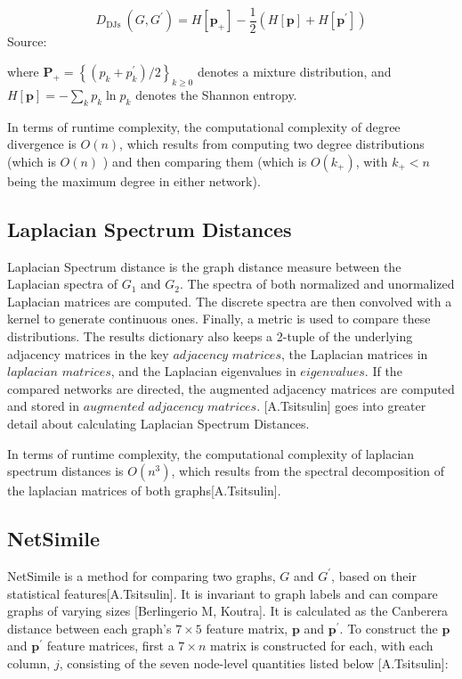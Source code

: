 \begin{equation}
D_{\text {DJs }}\left(G, G^{\prime}\right)=H\left[\mathbf{p}_{+}\right]-\frac{1}{2}\left(H[\mathbf{p}]+H\left[\mathbf{p}^{\prime}\right]\right)
\end{equation}
Source: \cite{Tsitsulin:2018:1}

where $\mathbf{P}_{+}=\left\{\left(p_{k}+p_{k}^{\prime}\right) / 2\right\}_{k \geq 0}$ denotes a mixture distribution, and $H[\mathbf{p}]=-\sum_{k} p_{k} \ln p_{k}$ denotes the Shannon entropy. 

In terms of runtime complexity, the computational complexity of degree divergence is $O(n)$, which results from computing two degree distributions (which is $O(n)$ ) and then comparing them (which is $O\left(k_{+}\right)$, with $k_{+}<n$ being the maximum degree in either network)\cite{Tsitsulin:2018:1}.

\subsection{Laplacian Spectrum Distances}
Laplacian Spectrum distance is the graph distance measure between the Laplacian spectra of $G_1$ and ${G_2}$. The spectra of both normalized and unormalized Laplacian matrices are computed. The discrete spectra are then convolved with a kernel to generate continuous ones. Finally, a metric is used to compare these distributions. The results dictionary also keeps a 2-tuple of the underlying adjacency matrices in the key $adjacency$ $matrices$, the Laplacian matrices in $laplacian$ $matrices$, and the Laplacian eigenvalues in $eigenvalues$. If the compared networks are directed, the augmented adjacency matrices are computed and stored in $augmented$ $adjacency$ $matrices$. [A.Tsitsulin] goes into greater detail about calculating Laplacian Spectrum Distances.

In terms of runtime complexity, the computational complexity of laplacian spectrum distances is $O(n^{3})$, which results from the spectral decomposition of the laplacian matrices of both graphs[A.Tsitsulin].

\subsection{NetSimile}
NetSimile is a method for comparing two graphs, $G$ and $G^{\prime}$, based on their statistical features[A.Tsitsulin]. It is invariant to graph labels and can compare graphs of varying sizes [Berlingerio M, Koutra]. It is calculated as the Canberera distance between each graph's $7 \times 5$ feature matrix, $\mathbf{p}$ and $\mathbf{p}^{\prime}$. To construct the $\mathbf{p}$ and $\mathbf{p}^{\prime}$ feature matrices, first a $7 \times n$ matrix is constructed for each, with each column, $j$, consisting of the seven node-level quantities listed below [A.Tsitsulin]:

